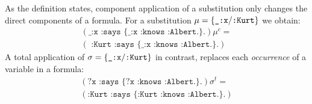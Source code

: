 As the definition states, component application of a substitution only changes the direct components of a formula. 
For a substitution $\mu=\{\verb!_:x!/ \verb!:Kurt!\}$ we obtain:
\begin{multline}
(\texttt{\_:x :says \{\_:x :knows :Albert.\}.})\mu^c  =\nonumber \\ (\texttt{ :Kurt :says \{\_:x :knows :Albert.\}.})\nonumber
\end{multline}
A total application of $\sigma=\{\verb!_:x!/ \verb!:Kurt!\}$ in contrast, replaces each \emph{occurrence} of a variable in a formula: 
\begin{multline}
(\texttt{?x :says \{?x :knows :Albert.\}.})\sigma^t =\\ (\texttt{:Kurt :says \{:Kurt :knows :Albert.\}.})\nonumber
\end{multline}







% 
% 
% 






